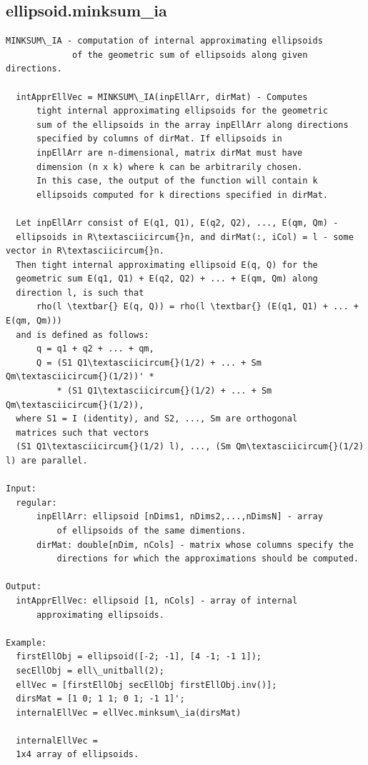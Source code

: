 \documentclass[letterpaper,10pt,english]{sphinxmanual}
\begin{document}
\subsection{ellipsoid.minksum\_ia}
\label{chap_functions:ellipsoid-minksum-ia}
\begin{Verbatim}[commandchars=\\\{\}]
MINKSUM\_IA - computation of internal approximating ellipsoids
             of the geometric sum of ellipsoids along given directions.

  intApprEllVec = MINKSUM\_IA(inpEllArr, dirMat) - Computes
      tight internal approximating ellipsoids for the geometric
      sum of the ellipsoids in the array inpEllArr along directions
      specified by columns of dirMat. If ellipsoids in
      inpEllArr are n-dimensional, matrix dirMat must have
      dimension (n x k) where k can be arbitrarily chosen.
      In this case, the output of the function will contain k
      ellipsoids computed for k directions specified in dirMat.

  Let inpEllArr consist of E(q1, Q1), E(q2, Q2), ..., E(qm, Qm) -
  ellipsoids in R\textasciicircum{}n, and dirMat(:, iCol) = l - some vector in R\textasciicircum{}n.
  Then tight internal approximating ellipsoid E(q, Q) for the
  geometric sum E(q1, Q1) + E(q2, Q2) + ... + E(qm, Qm) along
  direction l, is such that
      rho(l \textbar{} E(q, Q)) = rho(l \textbar{} (E(q1, Q1) + ... + E(qm, Qm)))
  and is defined as follows:
      q = q1 + q2 + ... + qm,
      Q = (S1 Q1\textasciicircum{}(1/2) + ... + Sm Qm\textasciicircum{}(1/2))' *
          * (S1 Q1\textasciicircum{}(1/2) + ... + Sm Qm\textasciicircum{}(1/2)),
  where S1 = I (identity), and S2, ..., Sm are orthogonal
  matrices such that vectors
  (S1 Q1\textasciicircum{}(1/2) l), ..., (Sm Qm\textasciicircum{}(1/2) l) are parallel.

Input:
  regular:
      inpEllArr: ellipsoid [nDims1, nDims2,...,nDimsN] - array
          of ellipsoids of the same dimentions.
      dirMat: double[nDim, nCols] - matrix whose columns specify the
          directions for which the approximations should be computed.

Output:
  intApprEllVec: ellipsoid [1, nCols] - array of internal
      approximating ellipsoids.

Example:
  firstEllObj = ellipsoid([-2; -1], [4 -1; -1 1]);
  secEllObj = ell\_unitball(2);
  ellVec = [firstEllObj secEllObj firstEllObj.inv()];
  dirsMat = [1 0; 1 1; 0 1; -1 1]';
  internalEllVec = ellVec.minksum\_ia(dirsMat)

  internalEllVec =
  1x4 array of ellipsoids.
\end{Verbatim}
\end{document}

